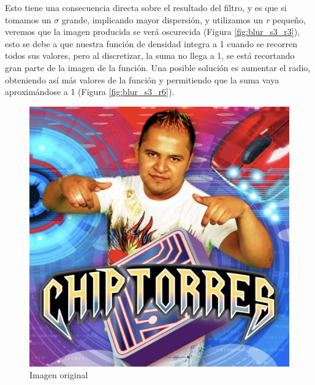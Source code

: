 Esto tiene una consecuencia directa sobre el resultado del filtro, y es que si
tomamos un $\sigma$ grande, implicando mayor dispersión, y utilizamos un
\textit{r} pequeño, veremos que la imagen producida se verá oscurecida (Figura \ref{fig:blur_s3_r3}), esto
se debe a que nuestra función de densidad integra a 1 cuando se recorren todos
sus valores, pero al discretizar, la suma no llega a 1, se está recortando gran
parte de la imagen de la función. Una posible solución es aumentar el radio,
obteniendo así más valores de la función y permitiendo que la suma vaya
aproximándose a 1 (Figura \ref{fig:blur_s3_r6}).

\begin{figure}[H]
	\centering
	\begin{minipage}{.3\textwidth}
		\centering
		\includegraphics[width=\linewidth]{imgs/blur_original.jpg}
		\caption{Imagen original}
		\label{fig:blur_original}
	\end{minipage}\hfill
	\begin{minipage}{.3\textwidth}
		\centering

\end{minipage}
\end{figure}
